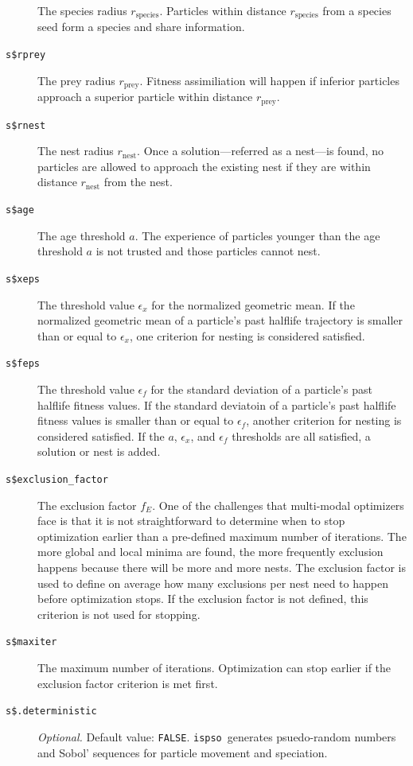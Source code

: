 \documentclass{article}
\def\ispso{\texttt{ispso}}
\begin{document}
\begin{description}
    The species radius $r_\text{species}$.
    Particles within distance $r_\text{species}$ from a species seed form a species and share information.
  \item[\texttt{s\$rprey}]
    The prey radius $r_\text{prey}$.
    Fitness assimiliation will happen if inferior particles approach a superior particle within distance $r_\text{prey}$.
  \item[\texttt{s\$rnest}]
    The nest radius $r_\text{nest}$.
    Once a solution---referred as a nest---is found, no particles are allowed to approach the existing nest if they are within distance $r_\text{nest}$ from the nest.
  \item[\texttt{s\$age}]
    The age threshold $a$.
    The experience of particles younger than the age threshold $a$ is not trusted and those particles cannot nest.
  \item[\texttt{s\$xeps}]
    The threshold value $\epsilon_x$ for the normalized geometric mean.
    If the normalized geometric mean of a particle's past halflife trajectory is smaller than or equal to $\epsilon_x$, one criterion for nesting is considered satisfied.
  \item[\texttt{s\$feps}]
    The threshold value $\epsilon_f$ for the standard deviation of a particle's past halflife fitness values.
    If the standard deviatoin of a particle's past halflife fitness values is smaller than or equal to $\epsilon_f$, another criterion for nesting is considered satisfied.
    If the $a$, $\epsilon_x$, and $\epsilon_f$ thresholds are all satisfied, a solution or nest is added.
  \item[\texttt{s\$exclusion\_factor}]
    The exclusion factor $f_E$.
    One of the challenges that multi-modal optimizers face is that it is not straightforward to determine when to stop optimization earlier than a pre-defined maximum number of iterations.
    The more global and local minima are found, the more frequently exclusion happens because there will be more and more nests.
    The exclusion factor is used to define on average how many exclusions per nest need to happen before optimization stops.
    If the exclusion factor is not defined, this criterion is not used for stopping.
  \item[\texttt{s\$maxiter}]
    The maximum number of iterations.
    Optimization can stop earlier if the exclusion factor criterion is met first.
  \item[\texttt{s\$.deterministic}]
    \textit{Optional.}
    Default value: \texttt{FALSE}.
    \ispso\ generates psuedo-random numbers and Sobol' sequences for particle movement and speciation.

\end{description}
\end{document}
